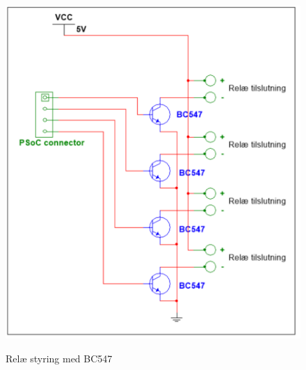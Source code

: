 \begin{figure}[H] \centering
{\includegraphics[width=\textwidth]{filer/design/Billeder/RELAY_CONTROL}}
\caption{Relæ styring med BC547}
\label{lab:RELAY_CONTROL}
\raggedright
\end{figure} 




 
